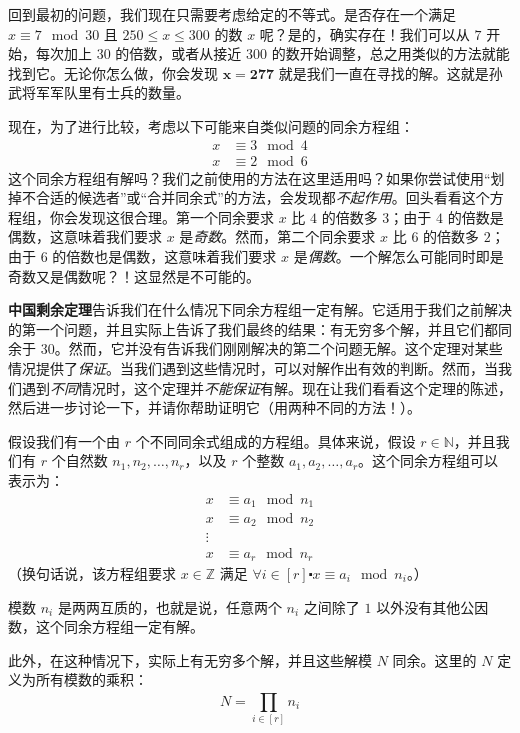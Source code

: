 回到最初的问题，我们现在只需要考虑给定的不等式。是否存在一个满足 $x \equiv 7 \mod 30$ 且 $250 \le x \le 300$ 的数 $x$ 呢？是的，确实存在！我们可以从 $7$ 开始，每次加上 $30$ 的倍数，或者从接近 $300$ 的数开始调整，总之用类似的方法就能找到它。无论你怎么做，你会发现 $\mathbf{x = 277}$ 就是我们一直在寻找的解。这就是孙武将军军队里有士兵的数量。

现在，为了进行比较，考虑以下可能来自类似问题的同余方程组：
\begin{align*}
    x &\equiv 3 \mod 4 \\
    x &\equiv 2 \mod 6
\end{align*}
这个同余方程组有解吗？我们之前使用的方法在这里适用吗？如果你尝试使用``划掉不合适的候选者''或``合并同余式''的方法，会发现都\emph{不起作用}。回头看看这个方程组，你会发现这很合理。第一个同余要求 $x$ 比 $4$ 的倍数多 $3$；由于 $4$ 的倍数是偶数，这意味着我们要求 $x$ 是\emph{奇数}。然而，第二个同余要求 $x$ 比 $6$ 的倍数多 $2$；由于 $6$ 的倍数也是偶数，这意味着我们要求 $x$ 是\emph{偶数}。一个解怎么可能同时即是奇数又是偶数呢？！这显然是不可能的。

\textbf{中国剩余定理}告诉我们在什么情况下同余方程组一定有解。它适用于我们之前解决的第一个问题，并且实际上告诉了我们最终的结果：有无穷多个解，并且它们都同余于 $30$。然而，它并没有告诉我们刚刚解决的第二个问题无解。这个定理对某些情况提供了\emph{保证}。当我们遇到这些情况时，可以对解作出有效的判断。然而，当我们遇到\emph{不同}情况时，这个定理并\emph{不能保证}有解。现在让我们看看这个定理的陈述，然后进一步讨论一下，并请你帮助证明它（用两种不同的方法！）。

\begin{theorem}\label{theorem6.5.28}
    假设我们有一个由 $r$ 个不同同余式组成的方程组。具体来说，假设 $r \in \mathbb{N}$，并且我们有 $r$ 个自然数 $n_1, n_2, \dots, n_r$，以及 $r$ 个整数 $a_1, a_2, \dots, a_r$。这个同余方程组可以表示为：
    \begin{align*}
        x &\equiv a_1 \mod n_1 \\
        x &\equiv a_2 \mod n_2 \\
        \vdots \\
        x &\equiv a_r \mod n_r
    \end{align*}
    （换句话说，该方程组要求 $x \in \mathbb{Z}$ 满足 $\forall i \in [r] \centerdot x \equiv a_i \mod n_i$。）

    模数 $n_i$ 是两两互质的，也就是说，任意两个 $n_i$ 之间除了 $1$ 以外没有其他公因数，这个同余方程组一定有解。

    此外，在这种情况下，实际上有无穷多个解，并且这些解模 $N$ 同余。这里的 $N$ 定义为所有模数的乘积：
    \[N = \prod_{i \in [r]}^{} n_i\]
\end{theorem}

